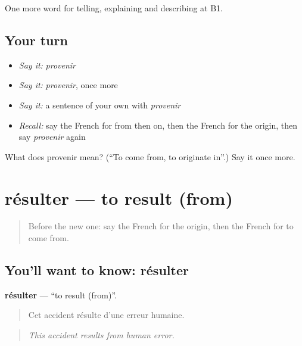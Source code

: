 \begin{grammarlens}[title={What you've built}]
One more word for telling, explaining and describing at B1.
\end{grammarlens}

\subsection*{Your turn}
\begin{itemize}
\raggedright
  \item \emph{Say it:} \emph{provenir}
  \item \emph{Say it:} \emph{provenir}, once more
  \item \emph{Say it:} a sentence of your own with \emph{provenir}
  \item \emph{Recall:} say the French for from then on, then the French for the origin, then say \emph{provenir} again
\end{itemize}

\begin{tcolorbox}[breakable,colback=teal!4,colframe=teal!35!black,title={Before you move on}]
What does provenir mean? (\textquotedblleft{}To come from, to originate in\textquotedblright{}.) Say it once more.
\end{tcolorbox}
\section[résulter]{résulter — to result (from)}

\label{lesson:FR-C349-resulter}



\begin{quote}
Before the new one: say the French for the origin, then the French for to come from.
\end{quote}

\subsection*{You'll want to know: résulter}
\textbf{résulter} — \textquotedblleft{}to result (from)\textquotedblright{}.

\begin{quote}
Cet accident résulte d'une erreur humaine.
\end{quote}

\begin{quote}
\emph{This accident results from human error.}
\end{quote}

